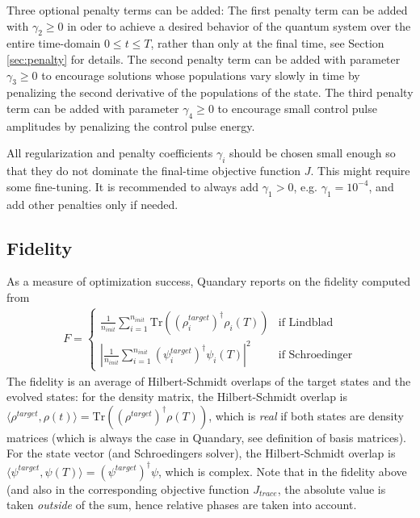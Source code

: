\documentclass[11pt]{article}
\begin{document}
Three optional penalty terms can be added: The first penalty term can be added with $\gamma_2 \geq 0$ in oder to achieve a desired behavior of the quantum system over the entire time-domain $0\leq t\leq T$, rather than only at the final time, see Section \ref{sec:penalty} for details. 
The second penalty term can be added with parameter $\gamma_3 \geq 0$ to encourage solutions whose populations vary slowly in time by penalizing the second derivative of the populations of the state. 
The third penalty term can be added with parameter $\gamma_4 \geq 0$ to encourage small control pulse amplitudes by penalizing the control pulse energy. 

All regularization and penalty coefficients $\gamma_i$ should be chosen small enough so that they do not dominate the final-time objective function $J$. This might require some fine-tuning. It is recommended to always add $\gamma_1>0$, e.g. $\gamma_1 = 10^{-4}$, and add other penalties only if needed. 

\subsection{Fidelity}\label{sec:fidelity}

As a measure of optimization success, Quandary reports on the fidelity computed from 
\begin{align}\label{eq:fidelity}
  F = \begin{cases}
    \frac{1}{n_{init}} \sum_{i=1}^{n_{init}} \mbox{Tr}\left(\left(\rho^{target}_i\right)^\dagger\rho_i(T) \right) & \text{if Lindblad} \\
    \left|\frac{1}{n_{init}} \sum_{i=1}^{n_{init}} (\psi^{target}_i)^\dagger \psi_i(T) \right|^2 & \text{if Schroedinger}
  \end{cases}
\end{align}
The fidelity is an average of Hilbert-Schmidt overlaps of the target states and the evolved states: for the density matrix, the Hilbert-Schmidt overlap is $\langle \rho^{target}, \rho(t)\rangle = \mbox{Tr}\left(\left(\rho^{target}\right)^\dagger\rho(T)\right)$, which is \textit{real} if both states are density matrices (which is always the case in Quandary, see definition of basis matrices). For the state vector (and Schroedingers solver), the Hilbert-Schmidt overlap is $\langle \psi^{target}, \psi(T)\rangle = (\psi^{target})^{\dagger}\psi $, which is complex. Note that in the fidelity above (and also in the corresponding objective function $J_{trace}$, the absolute value is taken \textit{outside} of the sum, hence relative phases are taken into account. 
\end{document}
